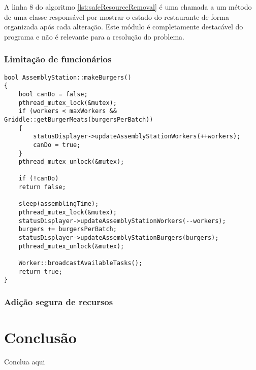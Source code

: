\documentclass[a4paper]{article}
\begin{document}
A linha 8 do algoritmo \ref{lst:safeResourceRemoval} é uma chamada a um método de uma classe responsável por mostrar o estado do restaurante de forma organizada após cada alteração. Este módulo é completamente destacável do programa e não é relevante para a resolução do problema.

\subsubsection{Limitação de funcionários}



\begin{lstlisting}[caption=Limitação de funcionários e adição segura de recursos\label{lst:limitWorkersNSafeAdd}]
bool AssemblyStation::makeBurgers()
{
	bool canDo = false;
	pthread_mutex_lock(&mutex);
	if (workers < maxWorkers && Griddle::getBurgerMeats(burgersPerBatch))
	{
		statusDisplayer->updateAssemblyStationWorkers(++workers);
		canDo = true;
	}
	pthread_mutex_unlock(&mutex);
	
	if (!canDo)
	return false;
	
	sleep(assemblingTime);
	pthread_mutex_lock(&mutex);
	statusDisplayer->updateAssemblyStationWorkers(--workers);
	burgers += burgersPerBatch;
	statusDisplayer->updateAssemblyStationBurgers(burgers);
	pthread_mutex_unlock(&mutex);
	
	Worker::broadcastAvailableTasks();
	return true;
}
\end{lstlisting}

\subsubsection{Adição segura de recursos}

\section{Conclusão}

Conclua aqui

\printbibliography
\end{document}

